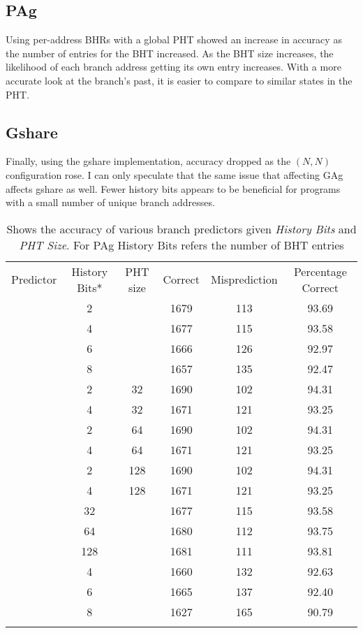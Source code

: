 \documentclass[letterpaper,11pt]{article}
\begin{document}
\subsection{PAg}
Using per-address BHRs with a global PHT showed an increase in accuracy as the number of entries for the BHT increased. As the BHT size increases, the likelihood of each branch address getting its own entry increases. With a more accurate look at the branch's past, it is easier to compare to similar states in the PHT.
\subsection{Gshare}
Finally, using the gshare implementation, accuracy dropped as the $(N,N)$ configuration rose. I can only speculate that the same issue that affecting GAg affects gshare as well. Fewer history bits appears to be beneficial for programs with a small number of unique branch addresses.


\begin{table}[tbh]
\centering
\begin{tabular}{!{\vrule width 1pt}c|c|c|c|c|c!{\vrule width 1pt}}
Predictor & History Bits* & PHT size & Correct & Misprediction & Percentage Correct\\
 & 2 &  & 1679 & 113 & 93.69\\
 & 4 &  & 1677 & 115 & 93.58\\
 & 6 &  & 1666 & 126 & 92.97\\
 & 8 &  & 1657 & 135 & 92.47\\
 & 2 & 32 & 1690 & 102 & 94.31\\
 & 4 & 32 & 1671 & 121 & 93.25\\
 & 2 & 64 & 1690 & 102 & 94.31\\
 & 4 & 64 & 1671 & 121 & 93.25\\
 & 2 & 128 & 1690 & 102 & 94.31\\
 & 4 & 128 & 1671 & 121 & 93.25\\
 & 32 &  & 1677 & 115 & 93.58\\
 & 64 &  & 1680 & 112 & 93.75\\
 & 128 &  & 1681 & 111 & 93.81\\
 & 4 &  & 1660 & 132 & 92.63\\
 & 6 &  & 1665 & 137 & 92.40\\
 & 8 &  & 1627 & 165 & 90.79\\
\end{tabular}
\caption{Shows the accuracy of various branch predictors given {\em History Bits} and {\em PHT Size}. 
{\scriptsize *For PAg History Bits refers the number of BHT entries}}
\end{table}
\end{document}
